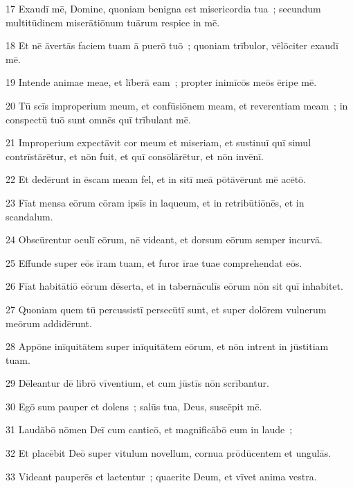 \psalmVerse
  {\phantom{0}17}
  {Exaudī mē, Domine, quoniam benigna est misericordia tua~; secundum multitūdinem miserātiōnum tuārum respice in mē.}


\psalmVerse
  {\phantom{0}18}
  {Et nē āvertās faciem tuam ā puerō tuō~; quoniam trībulor, vēlōciter exaudī mē.}


\psalmVerse
  {\phantom{0}19}
  {Intende animae meae, et līberā eam~; propter inimīcōs meōs ēripe mē.}


\psalmVerse
  {\phantom{0}20}
  {Tū scīs improperium meum, et confūsiōnem meam, et reverentiam meam~; in conspectū tuō sunt omnēs quī trībulant mē.}


\psalmVerse
  {\phantom{0}21}
  {Improperium expectāvit cor meum et miseriam, et sustinuī quī simul contrīstārētur, et nōn fuit, et quī consōlārētur, et nōn invēnī.}


\psalmVerse
  {\phantom{0}22}
  {Et dedērunt in ēscam meam fel, et in sitī meā pōtāvērunt mē acētō.}


\psalmVerse
  {\phantom{0}23}
  {Fīat mensa eōrum cōram ipsīs in laqueum, et in retribūtiōnēs, et in scandalum.}


\psalmVerse
  {\phantom{0}24}
  {Obscūrentur oculī eōrum, nē videant, et dorsum eōrum semper incurvā.}


\psalmVerse
  {\phantom{0}25}
  {Effunde super eōs īram tuam, et furor īrae tuae comprehendat eōs.}


\psalmVerse
  {\phantom{0}26}
  {Fīat habitātiō eōrum dēserta, et in tabernāculīs eōrum nōn sit quī inhabitet.}


\psalmVerse
  {\phantom{0}27}
  {Quoniam quem tū percussistī persecūtī sunt, et super dolōrem vulnerum meōrum addidērunt.}


\psalmVerse
  {\phantom{0}28}
  {Appōne inīquitātem super inīquitātem eōrum, et nōn intrent in jūstitiam tuam.}


\psalmVerse
  {\phantom{0}29}
  {Dēleantur dē librō vīventium, et cum jūstīs nōn scrībantur.}


\psalmVerse
  {\phantom{0}30}
  {Egō sum pauper et dolens~; salūs tua, Deus, suscēpit mē.}


\psalmVerse
  {\phantom{0}31}
  {Laudābō nōmen Deī cum canticō, et magnificābō eum in laude~;}


\psalmVerse
  {\phantom{0}32}
  {Et placēbit Deō super vitulum novellum, cornua prōdūcentem et ungulās.}


\psalmVerse
  {\phantom{0}33}
  {Videant pauperēs et laetentur~; quaerite Deum, et vīvet anima vestra.}


